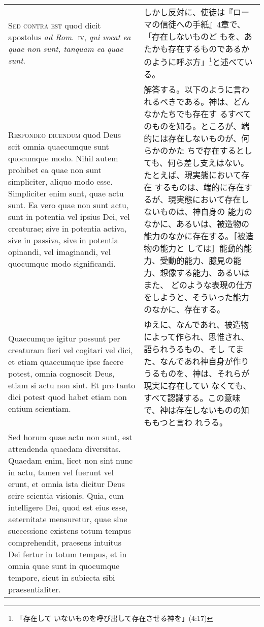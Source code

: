 \documentclass[10pt]{jsarticle} %
\begin{document}
\begin{longtable}{p{21em}p{21em}}
\\



{\scshape Sed contra est} quod dicit apostolus {\itshape ad
 Rom}.~{\scshape iv}, {\itshape qui vocat ea quae non sunt, tanquam ea
 quae sunt}.

&

しかし反対に、使徒は『ローマの信徒への手紙』4章で、「存在しないものど
もを、あたかも存在するものであるかのように呼ぶ方」\footnote{「存在して
いないものを呼び出して存在させる神を」(4:17)}と述べている。


\\



{\scshape Respondeo dicendum} quod Deus scit omnia
 quaecumque sunt quocumque modo. Nihil autem prohibet ea quae non sunt
 simpliciter, aliquo modo esse. Simpliciter enim sunt, quae actu
 sunt. Ea vero quae non sunt actu, sunt in potentia vel ipsius Dei, vel
 creaturae; sive in potentia activa, sive in passiva, sive in potentia
 opinandi, vel imaginandi, vel quocumque modo significandi. 

&

解答する。以下のように言われるべきである。神は、どんなかたちでも存在す
るすべてのものを知る。ところが、端的には存在しないものが、何らかのかた
ちで存在するとしても、何ら差し支えはない。たとえば、現実態において存在
するものは、端的に存在するが、現実態において存在しないものは、神自身の
能力のなかに、あるいは、被造物の能力のなかに存在する。［被造物の能力と
しては］能動的能力、受動的能力、臆見の能力、想像する能力、あるいはまた、
どのような表現の仕方をしようと、そういった能力のなかに、存在する。

\\



Quaecumque
 igitur possunt per creaturam fieri vel cogitari vel dici, et etiam
 quaecumque ipse facere potest, omnia cognoscit Deus, etiam si actu non
 sint. Et pro tanto dici potest quod habet etiam non entium
 scientiam.  

&

ゆえに、なんであれ、被造物によって作られ、思惟され、語られうるもの、そし
 てまた、なんであれ神自身が作りうるものを、神は、それらが現実に存在してい
 なくても、すべて認識する。この意味で、神は存在しないものの知ももつと言わ
 れうる。


\\


Sed horum quae actu non sunt, est attendenda quaedam diversitas.
Quaedam enim, licet non sint nunc in actu, tamen vel fuerunt vel
erunt, et omnia ista dicitur Deus scire scientia visionis. Quia, cum
intelligere Dei, quod est eius esse, aeternitate mensuretur, quae sine
successione existens totum tempus comprehendit, praesens intuitus Dei
fertur in totum tempus, et in omnia quae sunt in quocumque tempore,
sicut in subiecta sibi praesentialiter.


\end{longtable}
\end{document}
